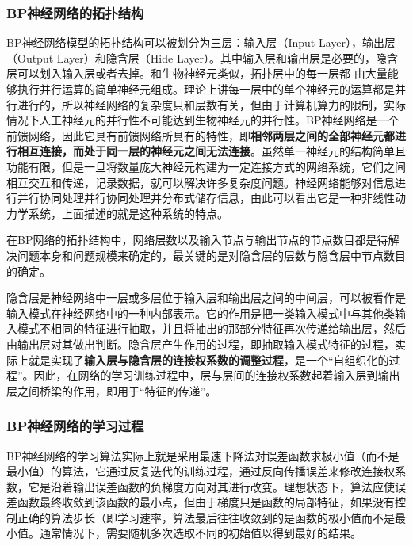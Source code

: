 \documentclass[UTF8]{ctexart}
\begin{document}
\subsubsection{BP神经网络的拓扑结构}

BP神经网络模型的拓扑结构可以被划分为三层：输入层（Input Layer），输出层（Output Layer）和隐含层（Hide Layer）。其中输入层和输出层是必要的，隐含层可以划入输入层或者去掉。和生物神经元类似，拓扑层中的每一层都
由大量能够执行并行运算的简单神经元组成。理论上讲每一层中的单个神经元的运算都是并行进行的，所以神经网络的复杂度只和层数有关，但由于计算机算力的限制，实际情况下人工神经元的并行性不可能达到生物神经元的并行性。BP神经网络是一个前馈网络，因此它具有前馈网络所具有的特性，即\textbf{相邻两层之间的全部神经元都进行相互连接，而处于同一层的神经元之间无法连接}。虽然单一神经元的结构简单且功能有限，但是一旦将数量庞大神经元构建为一定连接方式的网络系统，它们之间相互交互和传递，记录数据，就可以解决许多复杂度问题。神经网络能够对信息进行并行协同处理并行协同处理并分布式储存信息，由此可以看出它是一种非线性动力学系统，上面描述的就是这种系统的特点。 \par

在BP网络的拓扑结构中，网络层数以及输入节点与输出节点的节点数目都是待解决问题本身和问题规模来确定的，最关键的是对隐含层的层数与隐含层中节点数目的确定。 \par

隐含层是神经网络中一层或多层位于输入层和输出层之间的中间层，可以被看作是输入模式在神经网络中的一种内部表示。它的作用是把一类输入模式中与其他类输入模式不相同的特征进行抽取，并且将抽出的那部分特征再次传递给输出层，然后由输出层对其做出判断。隐含层产生作用的过程，即抽取输入模式特征的过程，实际上就是实现了\textbf{输入层与隐含层的连接权系数的调整过程}，是一个“自组织化的过程”。因此，在网络的学习训练过程中，层与层间的连接权系数起着输入层到输出层之间桥梁的作用，即用于“特征的传递”。

\subsubsection{BP神经网络的学习过程}

BP神经网络的学习算法实际上就是采用最速下降法对误差函数求极小值（而不是最小值）的算法，它通过反复迭代的训练过程，通过反向传播误差来修改连接权系数，它是沿着输出误差函数的负梯度方向对其进行改变。理想状态下，算法应使误差函数最终收敛到该函数的最小点，但由于梯度只是函数的局部特征，如果没有控制正确的算法步长（即学习速率，算法最后往往收敛到的是函数的极小值而不是最小值。通常情况下，需要随机多次选取不同的初始值以得到最好的结果。
\end{document}
